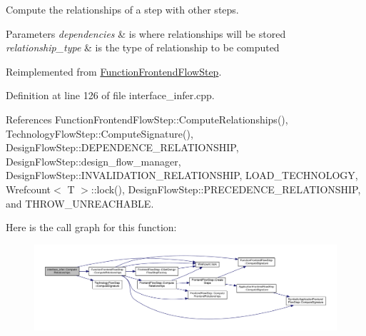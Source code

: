 Compute the relationships of a step with other steps. 


\begin{DoxyParams}{Parameters}
{\em dependencies} & is where relationships will be stored \\
\hline
{\em relationship\+\_\+type} & is the type of relationship to be computed \\
\hline
\end{DoxyParams}


Reimplemented from \hyperlink{classFunctionFrontendFlowStep_a1a815ea7885f3e92e414dadd40c43cba}{Function\+Frontend\+Flow\+Step}.



Definition at line 126 of file interface\+\_\+infer.\+cpp.



References Function\+Frontend\+Flow\+Step\+::\+Compute\+Relationships(), Technology\+Flow\+Step\+::\+Compute\+Signature(), Design\+Flow\+Step\+::\+D\+E\+P\+E\+N\+D\+E\+N\+C\+E\+\_\+\+R\+E\+L\+A\+T\+I\+O\+N\+S\+H\+IP, Design\+Flow\+Step\+::design\+\_\+flow\+\_\+manager, Design\+Flow\+Step\+::\+I\+N\+V\+A\+L\+I\+D\+A\+T\+I\+O\+N\+\_\+\+R\+E\+L\+A\+T\+I\+O\+N\+S\+H\+IP, L\+O\+A\+D\+\_\+\+T\+E\+C\+H\+N\+O\+L\+O\+GY, Wrefcount$<$ T $>$\+::lock(), Design\+Flow\+Step\+::\+P\+R\+E\+C\+E\+D\+E\+N\+C\+E\+\_\+\+R\+E\+L\+A\+T\+I\+O\+N\+S\+H\+IP, and T\+H\+R\+O\+W\+\_\+\+U\+N\+R\+E\+A\+C\+H\+A\+B\+LE.

Here is the call graph for this function\+:
\nopagebreak
\begin{figure}[H]
\begin{center}
\leavevmode
\includegraphics[width=350pt]{d9/d8a/classinterface__infer_adaf46bd679e004e36be194484e47e54e_cgraph}
\end{center}
\end{figure}
\mbox{\label{classinterface__infer_ab4aeabadb7b03a53d0605a3cc88fe6df}} 
